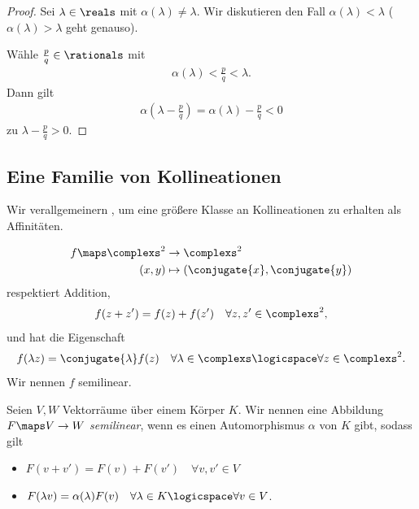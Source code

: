 \begin{proof}
    Sei \( \lambda\in \reals \) mit \( \alpha(\lambda)\neq \lambda \). Wir diskutieren den Fall \( \alpha(\lambda)<\lambda \) (\( \alpha(\lambda)>\lambda \) geht genauso).

    Wähle \( \frac{p}{q}\in \rationals \) mit
    \begin{align*}
        \alpha(\lambda)<\frac{p}{q}<\lambda.
    \end{align*}
    Dann gilt
    \begin{align*}
        \alpha(\lambda-\frac{p}{q})=\alpha(\lambda)-\frac{p}{q}<0
    \end{align*}
    \contra zu \( \lambda-\frac{p}{q}>0 \).
\end{proof}

\subsection*{Eine Familie von Kollineationen}
\begin{idee*}
    Wir verallgemeinern , um eine größere Klasse an Kollineationen zu erhalten als Affinitäten.
\end{idee*}
\begin{beispiel}
    \begin{align*}
        f\maps \begin{aligned}[t]
            \complexs^2&\to \complexs^2\\
            (x,y)&\mapsto (\conjugate{x},\conjugate{y})
        \end{aligned}
    \end{align*}
    respektiert Addition, \dh
    \begin{align*}
        f(z+z')=f(z)+f(z')\quad \forall z,z'\in \complexs^2,
    \end{align*}
    und hat die Eigenschaft
    \begin{align*}
        f(\lambda z)=\conjugate{\lambda} f(z)\quad \forall \lambda\in \complexs\logicspace \forall z\in \complexs^2.
    \end{align*}
    \tto Wir nennen \( f \) semilinear.
\end{beispiel}
\begin{definition*}
    Seien \( V,W \) Vektorräume über einem Körper \( K \). Wir nennen eine Abbildung \( F\maps V\to W \) \emph{semilinear}, wenn es einen Automorphismus \( \alpha \) von \( K \) gibt, sodass gilt
    \begin{itemize}
        \item \(F(v+v')=F(v)+F(v')\quad \forall v,v'\in V\)
        \item \( F(\lambda v)=\alpha(\lambda) F(v)\quad \forall \lambda\in K \logicspace \forall v\in V\).
    \end{itemize}
\end{definition*}
